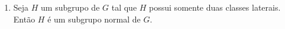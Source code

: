 \documentclass{beamer}
\begin{document}
    \begin{frame}
        \begin{exemplos}
            \begin{enumerate}[label=({\arabic*})]
                \conti

                \item Seja $H$ um subgrupo de $G$ tal que $H$ possui somente duas classes laterais. Então $H$ é um subgrupo normal de $G$.
                
                \seti
            \end{enumerate}
        \end{exemplos}
    \end{frame}
\end{document}
